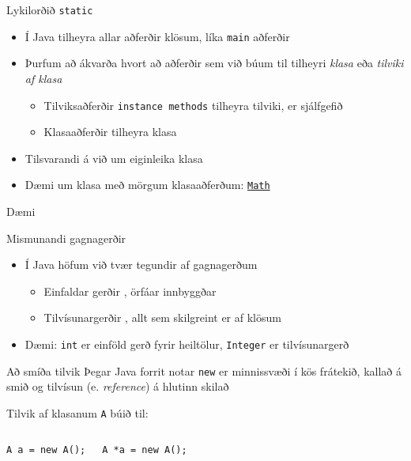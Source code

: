 \documentclass{beamer}
\begin{document}
\begin{frame}{Lykilorðið \texttt{static}}
	\begin{itemize}
		\item Í Java tilheyra allar aðferðir klösum, líka \texttt{main} aðferðir
		\item Þurfum að ákvarða hvort að aðferðir sem við búum til tilheyri \emph{klasa} eða \emph{tilviki af klasa}
		      \begin{itemize}
			      \item Tilviksaðferðir \texttt{instance methods} tilheyra tilviki, er sjálfgefið
			      \item Klasaaðferðir  tilheyra klasa
		      \end{itemize}
		\item Tilsvarandi á við um eiginleika klasa 
		\item Dæmi um klasa með mörgum klasaaðferðum: \href{https://docs.oracle.com/javase/8/docs/api/java/lang/Math.html}{\texttt{Math}}
	\end{itemize}
\end{frame}

\begin{frame}{Dæmi}
\end{frame}

\begin{frame}[fragile]{Mismunandi gagnagerðir}
	\begin{itemize}
		\item Í Java höfum við tvær tegundir af gagnagerðum
		      \begin{itemize}
			      \item Einfaldar gerðir , örfáar innbyggðar
			      \item Tilvísunargerðir , allt sem skilgreint er af klösum
		      \end{itemize}
		\item Dæmi: \texttt{int} er einföld gerð fyrir heiltölur, \texttt{Integer} er tilvísunargerð
	\end{itemize}
\end{frame}

\begin{frame}[fragile]{Að smíða tilvik}
	Þegar Java forrit notar \texttt{new} er minnissvæði í kös frátekið, kallað á smið og tilvísun (e. \emph{reference}) á hlutinn skilað
	\begin{center}
		Tilvik af klasanum \texttt{A} búið til:

		\vspace{-0.5cm}
	\end{center}
	\begin{columns}
		\begin{verbatim}
A a = new A();
\end{verbatim}
		\begin{verbatim}
A *a = new A();
\end{verbatim}
	\end{columns}
\end{frame}
\end{document}
